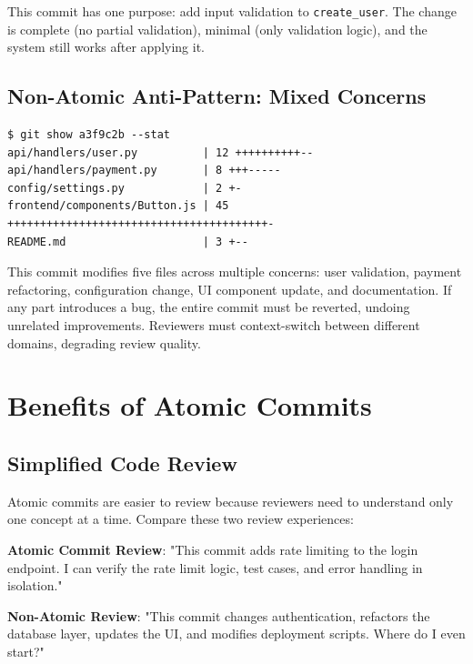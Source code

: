 This commit has one purpose: add input validation to \texttt{create\_user}. The change is complete (no partial validation), minimal (only validation logic), and the system still works after applying it.

\subsection{Non-Atomic Anti-Pattern: Mixed Concerns}

\begin{lstlisting}[style=shell,caption={A commit mixing unrelated changes}]
$ git show a3f9c2b --stat
api/handlers/user.py          | 12 ++++++++++--
api/handlers/payment.py       | 8 +++-----
config/settings.py            | 2 +-
frontend/components/Button.js | 45 ++++++++++++++++++++++++++++++++++++++++-
README.md                     | 3 +--
\end{lstlisting}

This commit modifies five files across multiple concerns: user validation, payment refactoring, configuration change, UI component update, and documentation. If any part introduces a bug, the entire commit must be reverted, undoing unrelated improvements. Reviewers must context-switch between different domains, degrading review quality.

\section{Benefits of Atomic Commits}

\subsection{Simplified Code Review}
Atomic commits are easier to review because reviewers need to understand only one concept at a time. Compare these two review experiences:

\begin{tipbox}
\textbf{Atomic Commit Review}: "This commit adds rate limiting to the login endpoint. I can verify the rate limit logic, test cases, and error handling in isolation."
\end{tipbox}

\begin{warningbox}
\textbf{Non-Atomic Review}: "This commit changes authentication, refactors the database layer, updates the UI, and modifies deployment scripts. Where do I even start?"
\end{warningbox}

